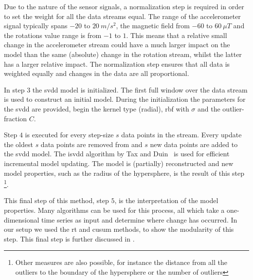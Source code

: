 Due to the nature of the sensor signals, a normalization step is required in order to set the weight for all the data streams equal.
The range of the accelerometer signal typically spans $-20$ to $20~m/s^2$, the magnetic field from $-60$ to $60~\mu T$ and the rotations value range is from $-1$ to $1$.
This means that a relative small change in the accelerometer stream could have a much larger impact on the model than the same (absolute) change in the rotation stream, whilst the latter has a larger relative impact.
The normalization step ensures that all data is weighted equally and changes in the data are all proportional.

In step $3$ the \gls{svdd} model is initialized.
The first full window over the data stream is used to construct an initial model.
During the initialization the parameters for the \gls{svdd} are provided, begin the kernel type (radial), \gls{rbf} with $\sigma$ and the outlier-fraction $C$.

Step $4$ is executed for every step-size $s$ data points in the stream.
Every update the oldest $s$ data points are removed from and $s$ new data points are added to the \gls{svdd} model.
The \gls{isvdd} algorithm by Tax and Duin~\cite{tax2002uniform} is used for efficient incremental model updating.
The model is (partially) reconstructed and new model properties, such as the radius of the hypersphere, is the result of this step \footnote{Other measures are also possible, for instance the distance from all the outliers to the boundary of the hypersphere or the number of outliers}.

This final step of this method, step $5$, is the interpretation of the model properties.
Many algorithms can be used for this process, all which take a one-dimensional time series as input and determine where change has occurred.
In our setup we used the \gls{rt} and \gls{cusum} methods, to show the modularity of this step.
This final step is further discussed in .